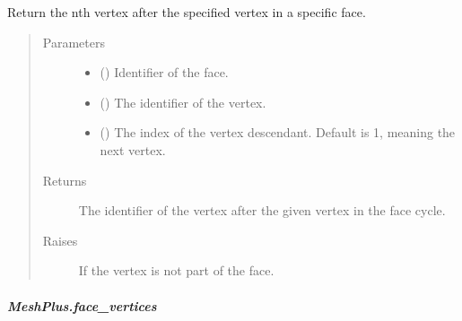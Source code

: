 \documentclass[letterpaper,10pt,english]{sphinxmanual}
\begin{document}
\begin{fulllineitems}
\begin{fulllineitems}
\label{\detokenize{api/generated/directional_clustering.mesh.MeshPlus.face_vertex_descendant:directional_clustering.mesh.MeshPlus.face_vertex_descendant}}
Return the n\sphinxhyphen{}th vertex after the specified vertex in a specific face.
\begin{quote}\begin{description}
\item[{Parameters}] \leavevmode\begin{itemize}
\item {} 
 () \textendash{} Identifier of the face.

\item {} 
 () \textendash{} The identifier of the vertex.

\item {} 
 () \textendash{} The index of the vertex descendant. Default is 1, meaning the next vertex.

\end{itemize}

\item[{Returns}] \leavevmode
{} \textendash{} The identifier of the vertex after the given vertex in the face cycle.

\item[{Raises}] \leavevmode
{} \textendash{} If the vertex is not part of the face.

\end{description}\end{quote}

\end{fulllineitems}



\subparagraph{MeshPlus.face\_vertices}
\label{\detokenize{api/generated/directional_clustering.mesh.MeshPlus.face_vertices:meshplus-face-vertices}}\label{\detokenize{api/generated/directional_clustering.mesh.MeshPlus.face_vertices::doc}}


\end{fulllineitems}
\end{document}
